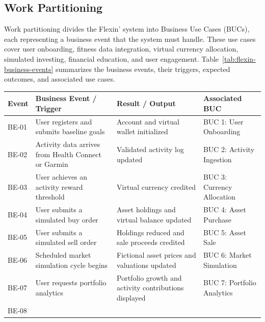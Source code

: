 \documentclass[12pt]{article}
\begin{document}
\subsection{Work Partitioning}

Work partitioning divides the Flexin' system into Business Use Cases (BUCs), each representing a business event that the system must handle.
These use cases cover user onboarding, fitness data integration,
virtual currency allocation, simulated investing, financial education,
and user engagement. Table~\ref{tab:flexin-business-events} summarizes
the business events, their triggers, expected outcomes, and associated
use cases.

\begin{table}[H]
    \centering
    \small
    \renewcommand{\arraystretch}{1.25}
    \begin{tabularx}{\textwidth}{
        |p{1.2cm}|X|X|p{3.2cm}|}
        \hline
        \textbf{Event} &
        \textbf{Business Event / Trigger} &
        \textbf{Result / Output} &
        \textbf{Associated BUC} \\
        \hline
        BE-01 &
        User registers and submits baseline goals &
        Account and virtual wallet initialized &
        BUC 1: User Onboarding \\
        \hline
        BE-02 &
        Activity data arrives from Health Connect or Garmin &
        Validated activity log updated &
        BUC 2: Activity Ingestion \\
        \hline
        BE-03 &
        User achieves an activity reward threshold &
        Virtual currency credited &
        BUC 3: Currency Allocation \\
        \hline
        BE-04 &
        User submits a simulated buy order &
        Asset holdings and virtual balance updated &
        BUC 4: Asset Purchase \\
        \hline
        BE-05 &
        User submits a simulated sell order &
        Holdings reduced and sale proceeds credited &
        BUC 5: Asset Sale \\
        \hline
        BE-06 &
        Scheduled market simulation cycle begins &
        Fictional asset prices and valuations updated &
        BUC 6: Market Simulation \\
        \hline
        BE-07 &
        User requests portfolio analytics &
        Portfolio growth and activity contributions displayed &
        BUC 7: Portfolio Analytics \\
        \hline
        BE-08 &

\end{tabularx}
\end{table}
\end{document}
